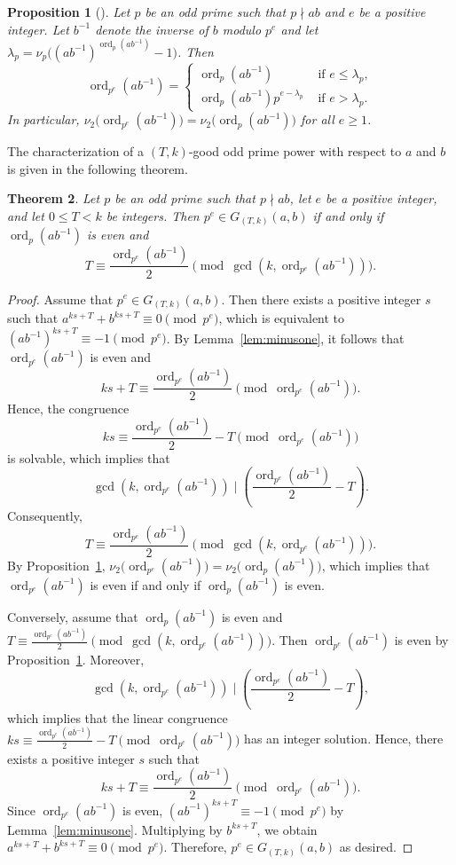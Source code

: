 \documentclass[pdflatex,sn-mathphys-num]{sn-jnl}%
\theoremstyle{thmstyleone}%
\newtheorem{theorem}{Theorem}%
\newtheorem{proposition}[theorem]{Proposition}%
\theoremstyle{thmstyletwo}%
\theoremstyle{thmstylethree}%
\newcommand{\ord}{\operatorname{ord}}
\begin{document}
 
\begin{proposition}[{\cite[Theorem 3.6]{N2000}}] \label{prop:liftorder}
Let $p$ be an odd prime such that  $p\nmid ab$ and  $e$ be a positive integer. Let $ b^{-1}$ denote the inverse of $b$ modulo $p^e$ and let $
\lambda_p=\nu_p\bigl((a b^{-1})^{\ord_p(a b^{-1})}-1\bigr)$.
Then 
\[
\ord_{p^e}(a b^{-1})=
\begin{cases}
\ord_p(a b^{-1}) &\text{ if } e\le \lambda_p,\\[1mm]
\ord_p(a b^{-1})p^{e-\lambda_p} & \text{ if } e>\lambda_p.
\end{cases}
\]
In particular,
$
\nu_2\bigl(\ord_{p^e}(a b^{-1})\bigr)=\nu_2\bigl(\ord_p(a b^{-1})\bigr) $ for all  $e\ge 1$.
\end{proposition}


The characterization of  a $(T,k)$-good  odd prime power with respect to $a$ and $b$ is given in the following theorem. 

\begin{theorem}\label{thm:local}
Let $p$ be an odd prime such that $p\nmid ab$, let $e$ be a positive integer, and let $0\le T<k$ be integers. Then
$
p^e\in G_{(T,k)}(a,b)$ 
if and only if $\ord_p(ab^{-1})$ is even and
\[
T\equiv \frac{\ord_{p^e}(ab^{-1})}{2}
\pmod{\gcd(k,\ord_{p^e}(ab^{-1}))}.
\]
\end{theorem}

\begin{proof}
Assume that
$
p^e\in G_{(T,k)}(a,b)$.
Then there exists a positive integer $s$ such that
$
a^{ks+T}+b^{ks+T}\equiv 0\pmod{p^e}$, which is equivalent to $
(ab^{-1})^{ks+T}\equiv -1\pmod{p^e}$.
By Lemma~\ref{lem:minusone}, it follows that $\ord_{p^e}(ab^{-1})$ is even and
\[
ks+T\equiv \frac{\ord_{p^e}(ab^{-1})}{2}\pmod{\ord_{p^e}(ab^{-1})}.
\]
Hence, the congruence
\[
ks\equiv \frac{\ord_{p^e}(ab^{-1})}{2}-T
\pmod{\ord_{p^e}(ab^{-1})}
\]
is solvable, which implies that
\[
\gcd(k,\ord_{p^e}(ab^{-1}))
\mid
\left(\frac{\ord_{p^e}(ab^{-1})}{2}-T\right).
\]
Consequently,
\[
T\equiv \frac{\ord_{p^e}(ab^{-1})}{2}
\pmod{\gcd(k,\ord_{p^e}(ab^{-1}))}.
\]
By Proposition~\ref{prop:liftorder},
$
\nu_2\bigl(\ord_{p^e}(ab^{-1})\bigr)=\nu_2\bigl(\ord_p(ab^{-1})\bigr)$, which implies that  $\ord_{p^e}(ab^{-1})$ is even if and only if $\ord_p(ab^{-1})$ is even.

Conversely, assume that $\ord_p(ab^{-1})$ is even and $
T\equiv \frac{\ord_{p^e}(ab^{-1})}{2}
\pmod{\gcd(k,\ord_{p^e}(ab^{-1}))}$.
Then $\ord_{p^e}(ab^{-1})$ is even by Proposition~\ref{prop:liftorder}. Moreover,
\[
\gcd(k,\ord_{p^e}(ab^{-1}))
\mid
\left(\frac{\ord_{p^e}(ab^{-1})}{2}-T\right),
\]
which implies that  the linear congruence
$
ks\equiv \frac{\ord_{p^e}(ab^{-1})}{2}-T
\pmod{\ord_{p^e}(ab^{-1})}$
has an integer solution. Hence, there exists a positive integer $s$ such that
\[
ks+T\equiv \frac{\ord_{p^e}(ab^{-1})}{2}\pmod{\ord_{p^e}(ab^{-1})}.
\]
Since $\ord_{p^e}(ab^{-1})$ is even, 
$
(ab^{-1})^{ks+T}\equiv -1\pmod{p^e}$ by Lemma~\ref{lem:minusone}. Multiplying by $b^{ks+T}$, we obtain $
a^{ks+T}+b^{ks+T}\equiv 0\pmod{p^e}$.
Therefore, $
p^e\in G_{(T,k)}(a,b)$ as desired.
\end{proof}
\end{document}

